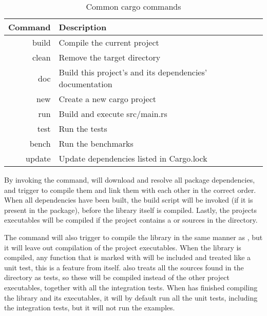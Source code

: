 \begin{table}[ht]
\begin{center}
\begin{tabular}{r|l}
\textbf{Command} & \textbf{Description}                           \\
\hline
build  & Compile the current project                              \\
clean  & Remove the target directory                              \\
doc    & Build this project's and its dependencies' documentation \\
new    & Create a new cargo project                               \\
run    & Build and execute src/main.rs                            \\
test   & Run the tests                                            \\
bench  & Run the benchmarks                                       \\
update & Update dependencies listed in Cargo.lock                 \\
\hline
\end{tabular}
\caption{Common cargo commands}
\label{tab:common_cargo_commands}
\end{center}
\end{table}

By invoking the  command, {\cargo} will download and resolve all package dependencies, and trigger  to compile them and link them with each other in the correct order.
When all dependencies have been built, the build script will be invoked (if it is present in the package), before the library itself is compiled.
Lastly, the projects executables will be compiled if the project contains a  or sources in the  directory.

The  command will also trigger  to compile the library in the same manner as , but it will leave out compilation of the project executables.
When the library is compiled, any function that is marked with \attrib{\#[test]} will be included and treated like a unit test, this is a feature from {\rust} itself.
\cargo also treats all the sources found in the  directory as tests, so these will be compiled instead of the other project executables, together with all the integration tests.
When {\cargo} has finished compiling the library and its executables, it will by default run all the unit tests, including the integration tests, but it will not run the examples.

